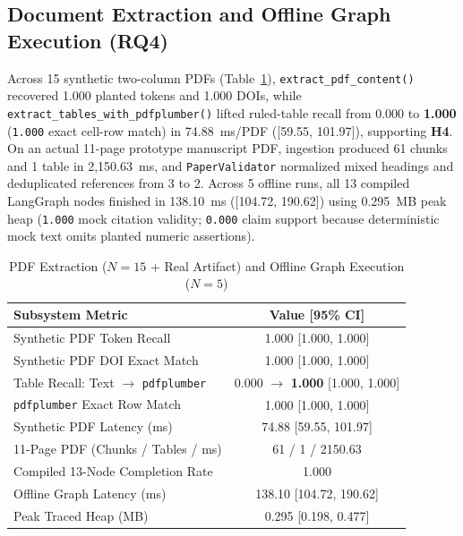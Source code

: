 \documentclass[conference]{IEEEtran}
\begin{document}
\subsection{Document Extraction and Offline Graph Execution (RQ4)}
Across 15 synthetic two-column PDFs (Table~\ref{tab:extraction_orch}), \texttt{extract\_pdf\_content()} recovered 1.000 planted tokens and 1.000 DOIs, while \texttt{extract\_tables\_with\_pdfplumber()} lifted ruled-table recall from 0.000 to \textbf{1.000} (\texttt{1.000} exact cell-row match) in 74.88~ms/PDF ([59.55, 101.97]), supporting \textbf{H4}. On an actual 11-page prototype manuscript PDF, ingestion produced 61 chunks and 1 table in 2,150.63~ms, and \texttt{PaperValidator} normalized mixed headings and deduplicated references from 3 to 2. Across 5 offline runs, all 13 compiled LangGraph nodes finished in 138.10~ms ([104.72, 190.62]) using 0.295~MB peak heap (\texttt{1.000} mock citation validity; \texttt{0.000} claim support because deterministic mock text omits planted numeric assertions).

\begin{table}[t]
\centering
\caption{PDF Extraction ($N{=}15$ + Real Artifact) and Offline Graph Execution ($N{=}5$)}
\label{tab:extraction_orch}
\footnotesize
\setlength{\tabcolsep}{4pt}
\begin{tabular}{p{4.6cm}c}
\toprule
\textbf{Subsystem Metric} & \textbf{Value [95\% CI]} \\
\midrule
Synthetic PDF Token Recall & 1.000 [1.000, 1.000] \\
Synthetic PDF DOI Exact Match & 1.000 [1.000, 1.000] \\
Table Recall: Text $\rightarrow$ \texttt{pdfplumber} & 0.000 $\rightarrow$ \textbf{1.000} [1.000, 1.000] \\
\texttt{pdfplumber} Exact Row Match & 1.000 [1.000, 1.000] \\
Synthetic PDF Latency (ms) & 74.88 [59.55, 101.97] \\
11-Page PDF (Chunks / Tables / ms) & 61 / 1 / 2150.63 \\
\midrule
Compiled 13-Node Completion Rate & 1.000 \\
Offline Graph Latency (ms) & 138.10 [104.72, 190.62] \\
Peak Traced Heap (MB) & 0.295 [0.198, 0.477] \\
\bottomrule
\end{tabular}
\end{table}
\end{document}
